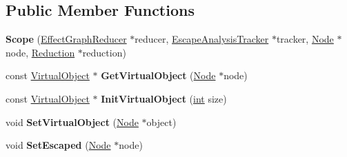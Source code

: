 \subsection*{Public Member Functions}
\begin{DoxyCompactItemize}
\item 
\mbox{\label{classv8_1_1internal_1_1compiler_1_1EscapeAnalysisTracker_1_1Scope_a0da5fb2010ef64804a854a51b005e64f}} 
{\bfseries Scope} (\mbox{\hyperlink{classv8_1_1internal_1_1compiler_1_1EffectGraphReducer}{Effect\+Graph\+Reducer}} $\ast$reducer, \mbox{\hyperlink{classv8_1_1internal_1_1compiler_1_1EscapeAnalysisTracker}{Escape\+Analysis\+Tracker}} $\ast$tracker, \mbox{\hyperlink{classv8_1_1internal_1_1compiler_1_1Node}{Node}} $\ast$node, \mbox{\hyperlink{classv8_1_1internal_1_1compiler_1_1EffectGraphReducer_1_1Reduction}{Reduction}} $\ast$reduction)
\item 
\mbox{\label{classv8_1_1internal_1_1compiler_1_1EscapeAnalysisTracker_1_1Scope_a8dc211f5254516605c59c38e228e86b5}} 
const \mbox{\hyperlink{classv8_1_1internal_1_1compiler_1_1VirtualObject}{Virtual\+Object}} $\ast$ {\bfseries Get\+Virtual\+Object} (\mbox{\hyperlink{classv8_1_1internal_1_1compiler_1_1Node}{Node}} $\ast$node)
\item 
\mbox{\label{classv8_1_1internal_1_1compiler_1_1EscapeAnalysisTracker_1_1Scope_a2cb3b94ef14cef560069eb923ee4870f}} 
const \mbox{\hyperlink{classv8_1_1internal_1_1compiler_1_1VirtualObject}{Virtual\+Object}} $\ast$ {\bfseries Init\+Virtual\+Object} (\mbox{\hyperlink{classint}{int}} size)
\item 
\mbox{\label{classv8_1_1internal_1_1compiler_1_1EscapeAnalysisTracker_1_1Scope_a5bdbbee660355b6fbf575de5ee6c8aa5}} 
void {\bfseries Set\+Virtual\+Object} (\mbox{\hyperlink{classv8_1_1internal_1_1compiler_1_1Node}{Node}} $\ast$object)
\item 
\mbox{\label{classv8_1_1internal_1_1compiler_1_1EscapeAnalysisTracker_1_1Scope_a99ae8c5318d3134d4b341b9f7de80383}} 
void {\bfseries Set\+Escaped} (\mbox{\hyperlink{classv8_1_1internal_1_1compiler_1_1Node}{Node}} $\ast$node)

\end{DoxyCompactItemize}
